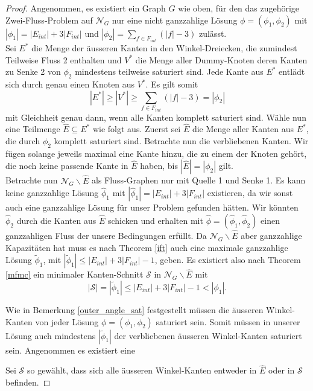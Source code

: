 \begin{proof}
Angenommen, es existiert ein Graph $G$ wie oben, für den das zugehörige Zwei-Fluss-Problem auf $\mathcal{N}_G$ nur eine nicht ganzzahlige Lösung $\phi = (\phi_1,\phi_2)$ mit $|\phi_1| = |E_{int}| + 3|F_{int}|$ und $|\phi_2| = \sum_{f \in F_{int}}{(|f|-3)}$ zulässt.\\
Sei $E^*$ die Menge der äusseren Kanten in den Winkel-Dreiecken, die zumindest Teilweise Fluss 2 enthalten und $V^*$ die Menge aller Dummy-Knoten deren Kanten zu Senke 2 von $\phi_2$ mindestens teilweise saturiert sind. Jede Kante aus $E^*$ entlädt sich durch genau einen Knoten aus $V^*$. Es gilt somit
$$|E^*| \geq |V^*| \geq \sum_{f \in F_{int}}{(|f|-3)} = |\phi_2|$$ 
mit Gleichheit genau dann, wenn alle Kanten komplett saturiert sind. Wähle nun eine Teilmenge $\hat{E} \subseteq E^*$ wie folgt aus. Zuerst sei $\hat{E}$ die Menge aller Kanten aus $E^*$, die durch $\phi_2$ komplett saturiert sind. Betrachte nun die verbliebenen Kanten. Wir fügen solange jeweils maximal eine Kante hinzu, die zu einem der Knoten gehört, die noch keine passende Kante in $\hat{E}$ haben, bis $|\hat{E}| = |\phi_2|$ gilt.\\

Betrachte nun $\mathcal{N}_G\backslash \hat{E}$ als Fluss-Graphen nur mit Quelle 1 und Senke 1. Es kann keine ganzzahlige Lösung $\hat{\phi}_1$ mit $|\hat{\phi}_1| = |E_{int}| + 3|F_{int}|$ existieren, da wir sonst auch eine ganzzahlige Lösung für unser Problem gefunden hätten. Wir könnten $\hat{\phi}_2$ durch die Kanten aus $\hat{E}$ schicken und erhalten mit $\hat{\phi} = (\hat{\phi}_1,\hat{\phi}_2)$ einen ganzzahligen Fluss der unsere Bedingungen erfüllt. Da $\mathcal{N}_G\backslash \hat{E}$ aber ganzzahlige Kapazitäten hat muss es nach Theorem \ref{ift} auch eine maximale ganzzahlige Lösung $\tilde{\phi}_1$, mit $|\tilde{\phi}_1| \leq |E_{int}| + 3|F_{int}| - 1$, geben. Es existiert also nach Theorem \ref{mfmc} ein minimaler Kanten-Schnitt $\mathcal{S}$ in $\mathcal{N}_G\backslash \hat{E}$ mit 
$$|\mathcal{S}| = |\tilde{\phi}_1| \leq |E_{int}| + 3|F_{int}| - 1 < |\phi_1|.$$

Wie in Bemerkung \ref{outer_angle_sat} festgestellt müssen die äusseren Winkel-Kanten von jeder Lösung $\phi = (\phi_1,\phi_2)$ saturiert sein. Somit müssen in unserer Lösung auch mindestens $|\tilde{\phi}_1|$ der verbliebenen äusseren Winkel-Kanten saturiert sein. Angenommen es existiert eine 


Sei $\mathcal{S}$ so gewählt, dass sich alle äusseren Winkel-Kanten entweder in $\hat{E}$ oder in $\mathcal{S}$ befinden. 


\end{proof}
